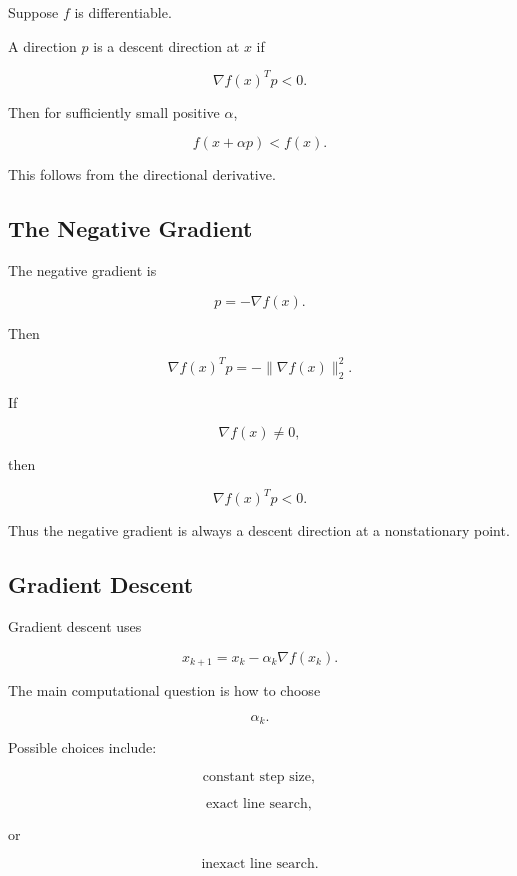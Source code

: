 Suppose \(f\) is differentiable.

A direction \(p\) is a descent direction at \(x\) if

\[
\boxed{
\nabla f(x)^Tp<0.
}
\]

Then for sufficiently small positive \(\alpha\),

\[
\boxed{
f(x+\alpha p)<f(x).
}
\]

This follows from the directional derivative.

\subsection{The Negative Gradient}
\label{subsec:negative-gradient-direction}

The negative gradient is

\[
\boxed{
p
=
-\nabla f(x).
}
\]

Then

\[
\nabla f(x)^Tp
=
-
\|\nabla f(x)\|_2^2.
\]

If

\[
\nabla f(x)\neq0,
\]

then

\[
\boxed{
\nabla f(x)^Tp<0.
}
\]

Thus the negative gradient is always a descent direction at a
nonstationary point.

\subsection{Gradient Descent}
\label{subsec:gradient-descent}

Gradient descent uses

\[
\boxed{
x_{k+1}
=
x_k
-
\alpha_k
\nabla f(x_k).
}
\]

The main computational question is how to choose

\[
\alpha_k.
\]

Possible choices include:

\[
\boxed{
\text{constant step size},
}
\]

\[
\boxed{
\text{exact line search},
}
\]

or

\[
\boxed{
\text{inexact line search}.
}
\]

